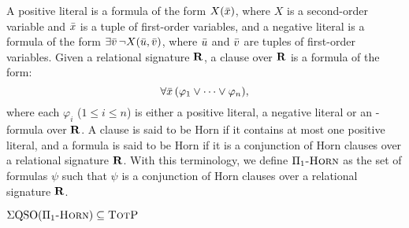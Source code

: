 \newcommand{\pP}{\textit{P}}
\newcommand{\pN}{\textit{N}}
\newcommand{\pV}{\textit{V}}
\newcommand{\pT}{\textit{T}}
\newcommand{\pA}{\textit{A}}
\newcommand{\pNC}{\textit{NC}}
\newcommand{\pD}{\textit{D}}


A positive literal is a formula of the form $X(\bar{x})$, where $X$ is a second-order variable and $\bar{x}$ is a tuple of first-order variables, and a negative literal is a formula of the form $\exists \bar{v} \, \neg X(\bar{u},\bar{v})$, where $\bar{u}$ and $\bar{v}$ are tuples of first-order variables. Given a relational signature $\mathbf{R}$, a clause over $\mathbf{R}$ is a formula of the form:
$$
\forall \bar{x} \, (\varphi_1 \vee \cdots \vee \varphi_n),
$$
where each $\varphi_i$ ($1 \leq i \leq n$) is either a positive literal, a negative literal or an \fo-formula over $\mathbf{R}$.  A clause is said to be Horn if it contains at most one positive literal, and a formula is said to be Horn if it is a conjunction of Horn clauses over a relational signature $\mathbf{R}$. With this terminology, we define $\Pi_1\textsc{-Horn}$ as the set of formulas $\psi$ such that $\psi$ is a conjunction of Horn clauses over a relational signature $\mathbf{R}$. 

\begin{proposition}\label{prop-uhorn-pe}
$\Sigma{\rm QSO}(\Pi_1\textsc{-Horn}) \subseteq \text{\sc TotP}$
\end{proposition}

